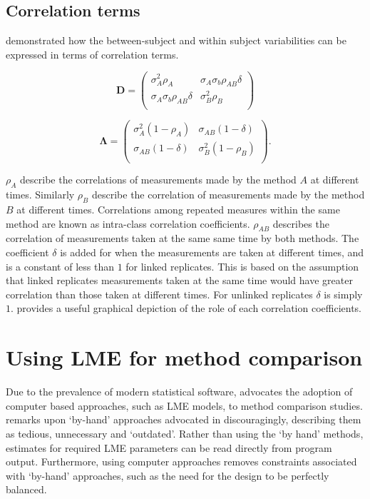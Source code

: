 \documentclass[12pt, a4paper]{article}
\theoremstyle{plain}
\theoremstyle{definition}
\theoremstyle{remark}
\begin{document}
\subsection{Correlation terms}
\citet{hamlett} demonstrated how the between-subject and within subject variabilities can be expressed in terms of
correlation terms.

\[
\boldsymbol{D} = \left( \begin{array}{cc}
                        \sigma^2_{A}\rho_{A} & \sigma_{A}\sigma_{b}\rho_{AB}\delta \\
                        \sigma_{A}\sigma_{b}\rho_{AB}\delta & \sigma^2_{B}\rho_{B}\\

                      \end{array}\right)
\]

\[
\boldsymbol{\Lambda} = \left(
\begin{array}{cc}
  \sigma^2_{A}(1-\rho_{A}) & \sigma_{AB}(1-\delta)  \\
    \sigma_{AB}(1-\delta) & \sigma^2_{B}(1-\rho_{B}) \\
\end{array}\right).
\]

$\rho_{A}$ describe the correlations of measurements made by the method $A$ at different times. Similarly $\rho_{B}$ describe the correlation of measurements made by the method $B$ at different times. Correlations among repeated measures within the same method are known as intra-class correlation coefficients. $\rho_{AB}$ describes the correlation of measurements taken at the same same time by both methods. The coefficient $\delta$ is added for when the measurements are taken at different times, and is a constant of less than $1$ for linked replicates. This is based on the assumption that linked replicates measurements taken at the same time would have greater correlation than those taken at different times. For unlinked replicates $\delta$ is simply $1$. \citet{hamlett} provides a useful graphical depiction of the role of each correlation coefficients.

\newpage
\section{Using LME for method comparison}
Due to the prevalence of modern statistical software, \citet{BXC2008} advocates the adoption of computer based approaches, such as LME models, to method comparison studies. \citet{BXC2008} remarks upon `by-hand' approaches advocated in \citet{BA99} discouragingly, describing them as tedious, unnecessary and `outdated'. Rather than using the `by hand' methods, estimates for required LME parameters can be read directly from program output. Furthermore, using computer approaches removes constraints associated with `by-hand' approaches, such as the need for the design to be perfectly balanced.
\end{document}
